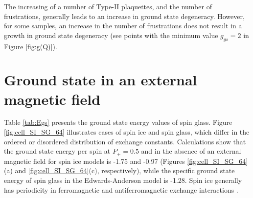 \documentclass[preprint,12pt]{elsarticle}
\begin{document}
The increasing of a number of Type-II plaquettes, and the number of frustrations, generally leads to an increase in ground state degeneracy. However, for some samples, an increase in the number of frustrations does not result in a growth in ground state degeneracy (see points with the minimum value $g_{gs}=2$ in Figure \ref{fig:g(Q)}). 

\section{Ground state in an external magnetic field}

Table \ref{tab:Egs} presents the ground state energy values of spin glass. Figure \ref{fig:cell_SI_SG_64} illustrates cases of spin ice and spin glass, which differ in the ordered or disordered distribution of exchange constants. Calculations show that the ground state energy per spin at $P_+ = 0.5$ and in the absence of an external magnetic field for spin ice models is -1.75 and -0.97 (Figures \ref{fig:cell_SI_SG_64}(a) and \ref{fig:cell_SI_SG_64}(c), respectively), while the specific ground state energy of spin glass in the Edwards-Anderson model is -1.28. Spin ice generally has periodicity in ferromagnetic and antiferromagnetic exchange interactions \cite{peretyatko2017interplay, otsuka2018husimi, andriushchenko2019large, shevchenko2017effect, kato2022flux}. 
\end{document}
